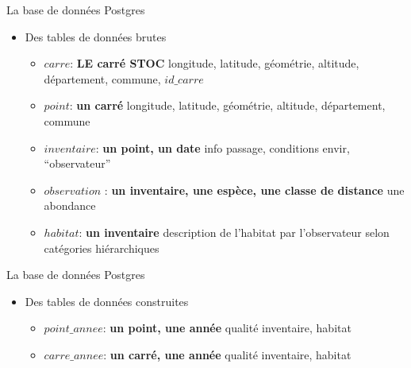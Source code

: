 \documentclass[]{beamer}
\begin{document}
\begin{frame}{La base de données Postgres}
  \begin{itemize}[<+->]
   \item Des tables de données brutes
  \begin{itemize}
  \item $carre$: \textbf{LE carré STOC}
     \newline longitude, latitude, géométrie, altitude, département, commune, $id\_carre$
   \item $point$: \textbf{un carré}
     \newline longitude, latitude, géométrie, altitude, département, commune
   \item $inventaire$: \textbf{un point, un date}
     \newline info passage, conditions envir, ``observateur''
   \item $observation$ : \textbf{un inventaire, une espèce, une classe
       de distance}
     \newline une abondance
   \item $habitat$: \textbf{un inventaire}
     \newline description de l'habitat par l’observateur selon catégories hiérarchiques
   \end{itemize}
    \end{itemize}
  \end{frame}
   


\begin{frame}{La base de données Postgres}
  \begin{itemize}[<+->]
   \item Des tables de données construites
     \begin{itemize}
     \item $point\_annee$: \textbf{un point, une année}
       \newline qualité inventaire, habitat
     \item $carre\_annee$: \textbf{un carré, une année}
       \newline qualité inventaire, habitat
     \end{itemize}
    \end{itemize}
  \end{frame}
\end{document}
